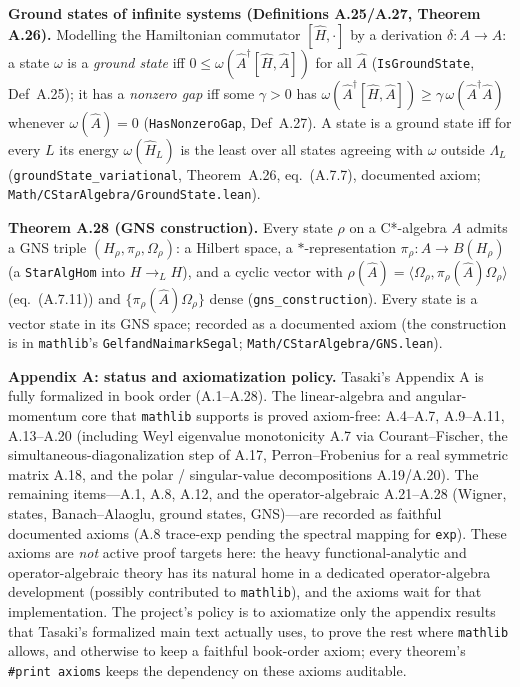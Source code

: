 \documentclass[a4paper,11pt]{article}
\begin{document}
\medskip\noindent\textbf{Ground states of infinite systems (Definitions A.25/A.27, Theorem A.26).}
Modelling the Hamiltonian commutator $[\hat H,\cdot]$ by a derivation $\delta:A\to A$: a state $\omega$
is a \emph{ground state} iff $0\le\omega(\hat A^\dagger[\hat H,\hat A])$ for all $\hat A$
(\texttt{IsGroundState}, Def~A.25); it has a \emph{nonzero gap} iff some $\gamma>0$ has
$\omega(\hat A^\dagger[\hat H,\hat A])\ge\gamma\,\omega(\hat A^\dagger\hat A)$ whenever $\omega(\hat A)=0$
(\texttt{HasNonzeroGap}, Def~A.27).  A state is a ground state iff for every $L$ its energy
$\omega(\hat H_L)$ is the least over all states agreeing with $\omega$ outside $\Lambda_L$
(\texttt{groundState\_variational}, Theorem~A.26, eq.~(A.7.7), documented axiom;
\texttt{Math/CStarAlgebra/GroundState.lean}).

\medskip\noindent\textbf{Theorem A.28 (GNS construction).}  Every state $\rho$ on a
C*-algebra $A$ admits a GNS triple $(H_\rho,\pi_\rho,\Omega_\rho)$: a Hilbert space, a
$*$-representation $\pi_\rho:A\to B(H_\rho)$ (a \texttt{StarAlgHom} into $H\to_L H$), and a cyclic
vector with $\rho(\hat A)=\langle\Omega_\rho,\pi_\rho(\hat A)\Omega_\rho\rangle$ (eq.~(A.7.11)) and
$\{\pi_\rho(\hat A)\Omega_\rho\}$ dense (\texttt{gns\_construction}).  Every state is a vector state in
its GNS space; recorded as a documented axiom (the construction is in \texttt{mathlib}'s
\texttt{GelfandNaimarkSegal}; \texttt{Math/CStarAlgebra/GNS.lean}).

\medskip\noindent\textbf{Appendix A: status and axiomatization policy.}  Tasaki's Appendix A is
fully formalized in book order (A.1--A.28).  The linear-algebra and angular-momentum core that
\texttt{mathlib} supports is proved axiom-free: A.4--A.7, A.9--A.11, A.13--A.20 (including Weyl
eigenvalue monotonicity A.7 via Courant--Fischer, the simultaneous-diagonalization step of A.17,
Perron--Frobenius for a real symmetric matrix A.18, and the polar / singular-value decompositions
A.19/A.20).  The remaining items---A.1, A.8, A.12, and the operator-algebraic A.21--A.28 (Wigner,
states, Banach--Alaoglu, ground states, GNS)---are recorded as faithful documented axioms (A.8
trace-exp pending the spectral mapping for \texttt{exp}).  These
axioms are \emph{not} active proof targets here: the heavy functional-analytic and operator-algebraic
theory has its natural home in a dedicated operator-algebra development (possibly contributed to
\texttt{mathlib}), and the axioms wait for that implementation.  The project's policy is to
axiomatize only the appendix results that Tasaki's formalized main text actually uses, to prove the
rest where \texttt{mathlib} allows, and otherwise to keep a faithful book-order axiom; every
theorem's \texttt{\#print axioms} keeps the dependency on these axioms auditable.
\end{document}
